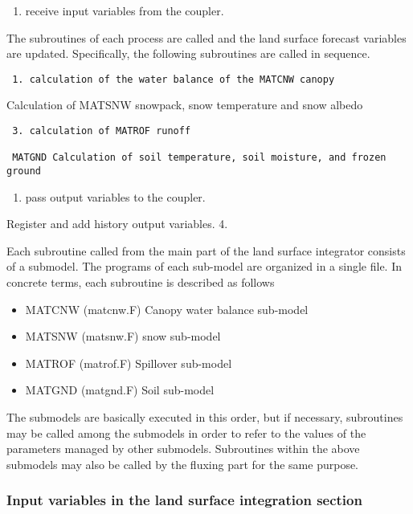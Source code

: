 \begin{enumerate}
\def\labelenumi{\arabic{enumi}.}
\tightlist
\item
  receive input variables from the coupler.
\end{enumerate}

The subroutines of each process are called and the land surface forecast
variables are updated. Specifically, the following subroutines are
called in sequence.

\begin{verbatim}
 1. calculation of the water balance of the MATCNW canopy
\end{verbatim}

Calculation of MATSNW snowpack, snow temperature and snow albedo

\begin{verbatim}
 3. calculation of MATROF runoff

 MATGND Calculation of soil temperature, soil moisture, and frozen ground
\end{verbatim}

\begin{enumerate}
\def\labelenumi{\arabic{enumi}.}
\setcounter{enumi}{2}
\tightlist
\item
  pass output variables to the coupler.
\end{enumerate}

Register and add history output variables. 4.

Each subroutine called from the main part of the land surface integrator
consists of a submodel. The programs of each sub-model are organized in
a single file. In concrete terms, each subroutine is described as
follows

\begin{itemize}
\item
  MATCNW (matcnw.F) Canopy water balance sub-model
\item
  MATSNW (matsnw.F) snow sub-model
\item
  MATROF (matrof.F) Spillover sub-model
\item
  MATGND (matgnd.F) Soil sub-model
\end{itemize}

The submodels are basically executed in this order, but if necessary,
subroutines may be called among the submodels in order to refer to the
values of the parameters managed by other submodels. Subroutines within
the above submodels may also be called by the fluxing part for the same
purpose.

\hypertarget{input-variables-in-the-land-surface-integration-section}{%
\subsubsection{Input variables in the land surface integration
section}\label{input-variables-in-the-land-surface-integration-section}}

